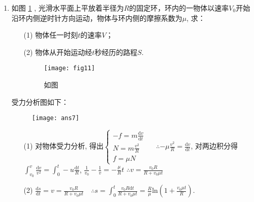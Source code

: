 \begin{enumerate}
\begin{solution}
    \end{solution}
    \item 如图 \ref{Fig:11} , 光滑水平面上平放着半径为$R$的固定环，环内的一物体以速率$V_0$开始沿环内侧逆时针方向运动，物体与环内侧的摩擦系数为$\mu$, 求：
    \begin{enumerate}
        \item[(1)] 物体任一时刻$t$的速率$V$；                                            
        \item[(2)] 物体从开始运动经$t$秒经历的路程$S$.
        \begin{figure}[H]
            \centering
            \texttt{[image: fig11]}
            \caption{如图}\label{Fig:11}
        \end{figure} 
    \end{enumerate}
    \begin{solution}
        受力分析图如下：
        \begin{figure}[H]
            \centering
            \texttt{[image: ans7]}
        \end{figure} 
        \begin{enumerate}
            \item[(1)]对物体受力分析, 得出$\begin{cases}
                -f = m\frac{\mathrm{d}v}{\mathrm{d}t} \\
                N = m\frac{v^2}{R}\\
                f = \mu N
            \end{cases}$ \ \ $\therefore -\mu \frac{v^2}{R} = \frac{\mathrm{d}v}{\mathrm{d}t}$, 对两边积分得\\ 
            $\displaystyle{\int_{v_0}^{v} \frac{\mathrm{d}v}{v^2}}=\int_0^t -u \frac{\mathrm{d}t}{R}$, $\frac{1}{v_0}-\frac{1}{v}=-\frac{\mu}{R}t$
            $\therefore v = \frac{v_0R}{R+v_0 \mu t}$
            \item[(2)] $\frac{\mathrm{d}s}{\mathrm{d}t}=v=\frac{v_0R}{R+v_0\mu t}$\ \ 
            $\therefore s = \displaystyle{\int_0^t \frac{v_0 R\mathrm{d}t}{R+v_0\mu t}=\frac{R}{\mu}\mathrm{ln}(1+\frac{v_0\mu t}{R})}$. 
        \end{enumerate}
    \end{solution}
\end{enumerate}
